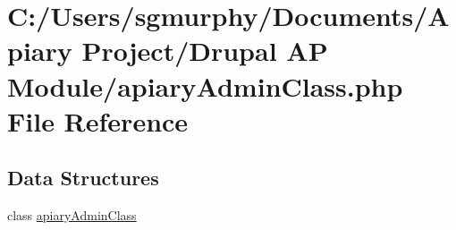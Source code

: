 \hypertarget{apiary_admin_class_8php}{
\section{C:/Users/sgmurphy/Documents/Apiary Project/Drupal AP Module/apiaryAdminClass.php File Reference}
\label{apiary_admin_class_8php}
}
\subsection*{Data Structures}
\begin{DoxyCompactItemize}
\item 
class \hyperlink{classapiary_admin_class}{apiaryAdminClass}
\end{DoxyCompactItemize}
